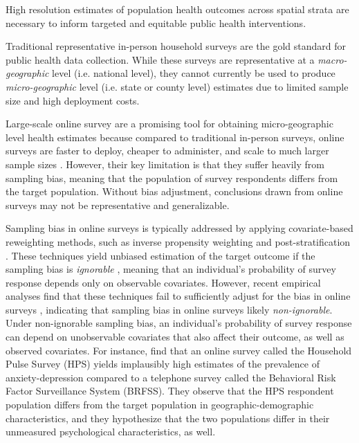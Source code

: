 




High resolution estimates of population health outcomes across spatial strata are necessary to inform targeted and equitable public health interventions. 

Traditional representative in-person household surveys are the gold standard for public health data collection. While these surveys are representative at a \textit{macro-geographic} level (i.e. national level), they cannot currently be used to produce \textit{micro-geographic} level (i.e. state or county level) estimates due to limited sample size and high deployment costs.

Large-scale online survey are a promising tool for obtaining micro-geographic level health estimates \citep{geldsetzer2020use, us2021measuring, salomon2021us} because compared to traditional in-person surveys, online surveys are faster to deploy, cheaper to administer, and scale to much larger sample sizes \citep{blumberg2021national}. However, their key limitation is that they suffer heavily from sampling bias, meaning that the population of survey respondents differs from the target population. Without bias adjustment, conclusions drawn from online surveys may not be representative and generalizable.

Sampling bias in online surveys is typically addressed by applying covariate-based reweighting methods, such as inverse propensity weighting and post-stratification \citep{ groves2011survey, rosenbaum1983central}. These techniques yield unbiased estimation of the target outcome if the sampling bias is \textit{ignorable} \citep{rubin1976inference}, meaning that an individual's probability of survey response depends only on observable covariates. However, recent empirical analyses find that these techniques fail to sufficiently adjust for the bias in online surveys \citep{bradley2021unrepresentative, kessler2022estimated}, indicating that sampling bias in online surveys likely \textit{non-ignorable}. Under non-ignorable sampling bias, an individual's probability of survey response can depend on unobservable covariates that also affect their outcome, as well as observed covariates. For instance, \citet{kessler2022estimated} find that an online survey called the Household Pulse Survey (HPS) yields implausibly high estimates of the prevalence of anxiety-depression compared to a telephone survey called the Behavioral Risk Factor Surveillance System (BRFSS). They observe that the HPS respondent population differs from the target population in geographic-demographic characteristics, and they hypothesize that the two populations differ in their unmeasured psychological characteristics, as well.


